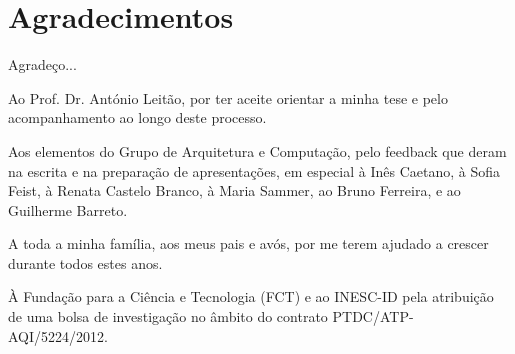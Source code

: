 
\chapter*{Agradecimentos}

Agradeço...

Ao Prof. Dr. António Leitão, por ter aceite orientar a minha tese e pelo acompanhamento ao longo deste processo.

Aos elementos do Grupo de Arquitetura e Computação, pelo feedback que deram na escrita e na preparação de apresentações, em especial à Inês Caetano, à Sofia Feist, à Renata Castelo Branco, à Maria Sammer, ao Bruno Ferreira, e ao Guilherme Barreto.

A toda a minha família, aos meus pais e avós, por me terem ajudado a crescer durante todos estes anos.

À Fundação para a Ciência e Tecnologia (FCT) e ao INESC-ID pela atribuição de uma bolsa de investigação no âmbito do contrato PTDC/ATP-AQI/5224/2012.






